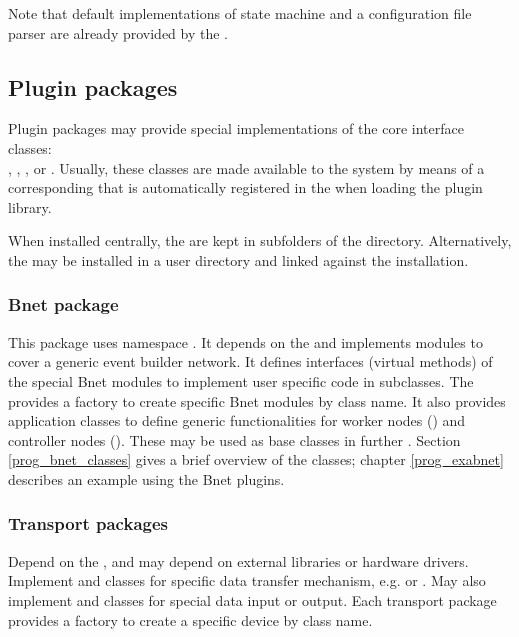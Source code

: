    Note that default implementations of state machine and a configuration file
   parser are already provided by the .

                
\subsection{Plugin packages}
Plugin packages may provide special implementations of the core interface classes: \\
, , , or
. Usually, these classes are made available to the system by means
of a corresponding  that is automatically registered in the  
when loading the plugin library.

When installed centrally, the  are kept in subfolders of the   directory.
Alternatively, the  may be installed in a user directory and linked against the
 installation.

\subsubsection{Bnet package}
   This package uses namespace . It depends on the  and implements 
   modules to cover a generic event builder network. 
   It defines interfaces (virtual methods) of the special Bnet modules to 
   implement user specific code in subclasses. The  provides a 
   factory to create specific Bnet modules by class name. It also 
   provides application classes to define generic functionalities for 
   worker nodes () and 
   controller nodes (). These may be used as base classes
   in further .
   Section \ref{prog_bnet_classes} gives a brief overview of the
 classes; chapter 
\ref{prog_exabnet}  describes an example using the Bnet
 plugins.
 
   
\subsubsection{Transport packages}
   Depend on the , and may depend on external libraries or hardware drivers. 
   Implement  and 
    classes for specific data transfer mechanism, e.g. 
    or . May also implement  
   and  classes for special data input or output. Each transport package provides a 
   factory to create a specific device by class name. 
   

